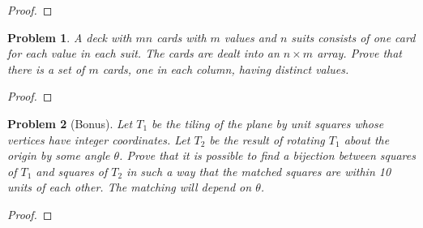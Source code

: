 \documentclass[11pt]{article}
\newtheorem{problem}{Problem}
\begin{document}
\begin{proof}

\end{proof}

\pagebreak
\begin{problem}
A deck with $mn$ cards with $m$ values and $n$ suits consists of one card for each value in each suit. The cards are dealt into an $n\times m$ array. Prove that there is a set of $m$ cards, one in each column, having distinct values. 
\end{problem}

\begin{proof}

\end{proof}

\pagebreak


\pagebreak

\begin{problem}[Bonus]
Let $T_1$ be the tiling of the plane by unit squares whose vertices have integer coordinates. Let $T_2$ be the result of rotating $T_1$ about the origin by some angle $\theta$. Prove that it is possible to find a bijection between squares of $T_1$ and squares of $T_2$ in such a way that the matched squares are within 10 units of each other. The matching will depend on $\theta$. 
\end{problem}


\begin{proof}

\end{proof}
\end{document}
